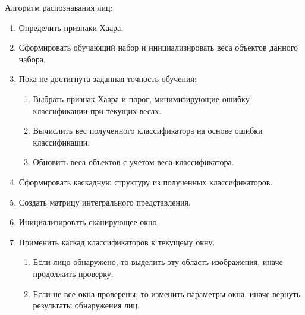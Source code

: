 Алгоритм распознавания лиц:

\begin{enumerate}[label*=\arabic*.]
    \item Определить признаки Хаара.
    \item Сформировать обучающий набор и инициализировать веса объектов данного набора.
    \item Пока не достигнута заданная точность обучения:
    \begin{enumerate}
        \item Выбрать признак Хаара и порог, минимизирующие ошибку классификации при текущих весах.
        \item Вычислить вес полученного классификатора на основе ошибки классификации.
        \item Обновить веса объектов с учетом веса классификатора.
    \end{enumerate}
    \item Сформировать каскадную структуру из полученных классификаторов.
    \item Создать матрицу интегрального представления.
    \item Инициализировать сканирующее окно.
    \item Применить каскад классификаторов к текущему окну.
    \begin{enumerate}
        \item Если лицо обнаружено, то выделить эту область изображения, иначе продолжить проверку.
        \item Если не все окна проверены, то изменить параметры окна, иначе вернуть результаты обнаружения лиц.
    \end{enumerate}
\end{enumerate}